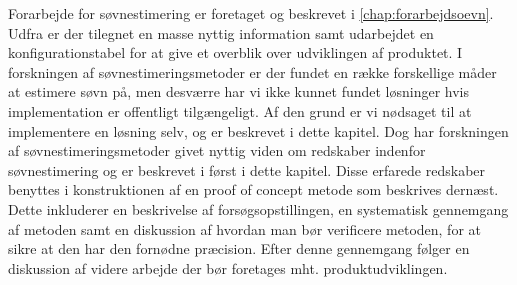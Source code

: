 Forarbejde for søvnestimering er foretaget og beskrevet i \cref{chap:forarbejdsoevn}.
Udfra er der tilegnet en masse nyttig information samt udarbejdet en konfigurationstabel for at give et overblik over udviklingen af produktet.
I forskningen af søvnestimeringsmetoder er der fundet en række forskellige måder at estimere søvn på, men desværre har vi ikke kunnet fundet løsninger hvis implementation er offentligt tilgængeligt.
Af den grund er vi nødsaget til at implementere en løsning selv, og er beskrevet i dette kapitel.
Dog har forskningen af søvnestimeringsmetoder givet nyttig viden om redskaber indenfor søvnestimering og er beskrevet i først i dette kapitel.
Disse erfarede redskaber benyttes i konstruktionen af en proof of concept metode som beskrives dernæst.
Dette inkluderer en beskrivelse af forsøgsopstillingen, en systematisk gennemgang af metoden samt en diskussion af hvordan man bør verificere metoden, for at sikre at den har den fornødne præcision.
Efter denne gennemgang følger en diskussion af videre arbejde der bør foretages mht. produktudviklingen.






